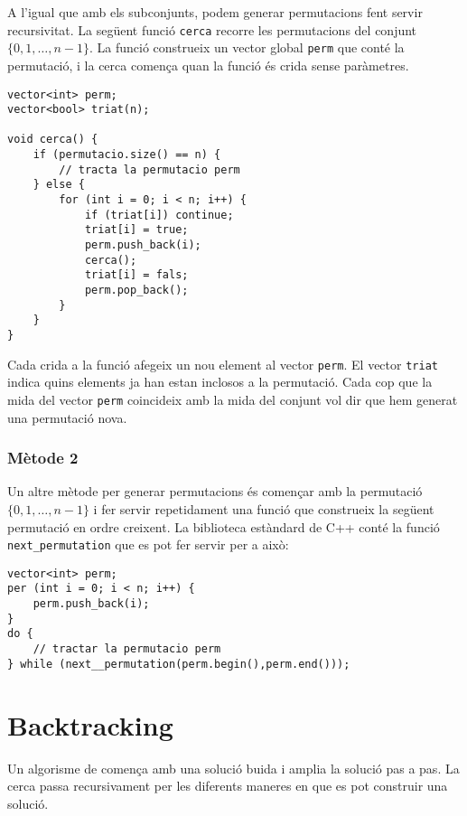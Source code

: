 A l'igual que amb els subconjunts, podem generar permutacions
fent servir recursivitat.
La següent funció \texttt{cerca} recorre
les permutacions del conjunt $\{0,1,\ldots,n-1\}$.
La funció construeix un vector global \texttt{perm}
que conté la permutació,
i la cerca comença quan la funció és
crida sense paràmetres.

\begin{lstlisting}
vector<int> perm;
vector<bool> triat(n);

void cerca() {
    if (permutacio.size() == n) {
        // tracta la permutacio perm
    } else {
        for (int i = 0; i < n; i++) {
            if (triat[i]) continue;
            triat[i] = true;
            perm.push_back(i);
            cerca();
            triat[i] = fals;
            perm.pop_back();
        }
    }
}
\end{lstlisting}

Cada crida a la funció afegeix un nou element
al vector \texttt{perm}.
El vector \texttt{triat} indica quins
elements ja han estan inclosos a la permutació.
Cada cop que la mida del vector \texttt{perm}
coincideix amb la mida del conjunt vol dir que hem generat
una permutació nova.

\subsubsection{Mètode 2}


Un altre mètode per generar permutacions
és començar amb la permutació
$\{0,1,\ldots,n-1\}$ i fer servir repetidament
una funció que construeix la següent permutació
en ordre creixent.
La biblioteca estàndard de C++ conté la funció
\texttt{next\_permutation} que es pot fer servir per a això:

\begin{lstlisting}
vector<int> perm;
per (int i = 0; i < n; i++) {
    perm.push_back(i);
}
do {
    // tractar la permutacio perm
} while (next__permutation(perm.begin(),perm.end()));
\end{lstlisting}

\section{Backtracking}


Un algorisme de 
comença amb una solució buida
i amplia la solució pas a pas.
La cerca passa recursivament
per les diferents maneres en que es
pot construir una solució.

